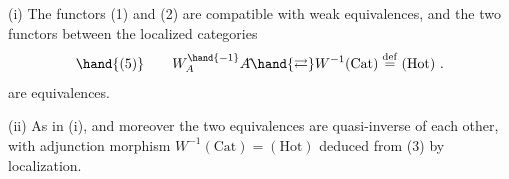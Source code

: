(i) The functors (1) and (2) are compatible with weak equivalences,
and the two  functors between the localized categories
\[ \hand{(5)} \qquad W_A^{\hand{-1}} A\hat{} \hand{\rightleftarrows} W^{-1}(\mathrm{Cat}) \overset{\mathrm{def}}{=} (\mathrm{Hot}) \ . \]
are equivalences.

(ii) As in (i), and moreover the two equivalences are quasi-inverse of
each other, with adjunction morphism   $W^{-1}(\mathrm{Cat}) = (\mathrm{Hot})$
deduced from (3) by localization.

